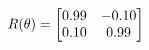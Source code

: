 \documentclass[preview]{standalone}
\begin{document}
\begin{align*}
\special{dvisvgm:raw <g id='unique000'>}R(\theta) = \begin{bmatrix}0.99 & -0.10\\0.10 & 0.99\end{bmatrix}\special{dvisvgm:raw </g>}
\end{align*}
\end{document}
